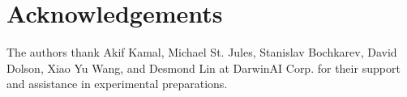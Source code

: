 \documentclass{article}
\begin{document}
\section*{Acknowledgements}
\vspace{-0.15in}
The authors thank Akif Kamal, Michael St. Jules, Stanislav Bochkarev, David Dolson, Xiao Yu Wang, and Desmond Lin at DarwinAI Corp. for their support and assistance in experimental preparations.
\vspace{-0.1in}{\footnotesize

\vspace{-0.1in}

}
\end{document}
